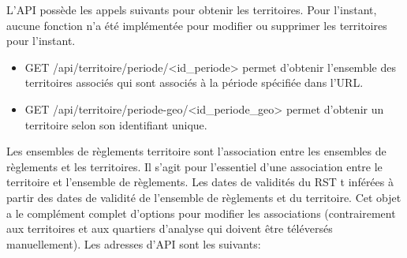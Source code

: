 L'\ac{API} possède les appels suivants pour obtenir les territoires. Pour l'instant, aucune fonction n'a été implémentée pour modifier ou supprimer les territoires pour l'instant.
\begin{itemize}
    \item GET /api/territoire/periode/<id\_periode> permet d'obtenir l'ensemble des territoires associés qui sont associés à la période spécifiée dans l'\ac{URL}.
    \item GET /api/territoire/periode-geo/<id\_periode\_geo> permet d'obtenir un territoire selon son identifiant unique.
\end{itemize}
Les ensembles de règlements territoire sont l'association entre les ensembles de règlements et les territoires. Il s'agit pour l'essentiel d'une association entre le territoire et l'ensemble de règlements. Les dates de validités du \ac{RST} t inférées à partir des dates de validité de l'ensemble de règlements et du territoire. Cet objet a le complément complet d'options pour modifier les associations (contrairement aux territoires et aux quartiers d'analyse qui doivent être téléversés manuellement). Les adresses d'\ac{API} sont les suivants:
